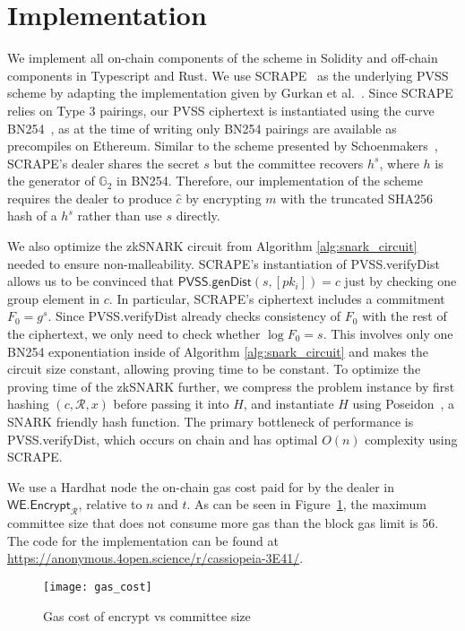 \section{Implementation}

We implement all on-chain components of the scheme in Solidity and off-chain components in Typescript and Rust.
We use SCRAPE~\cite{pvss_scrape} as the underlying PVSS scheme by adapting the implementation given by Gurkan et al.~\cite{aggregatable_dkg}.
Since SCRAPE relies on Type 3 pairings, our PVSS ciphertext is instantiated using the curve BN254~\cite{bn254}, as at the time of writing only BN254 pairings are available as precompiles on Ethereum.
Similar to the scheme presented by Schoenmakers~\cite{pvss_schoenmakers}, SCRAPE's dealer shares the secret $s$ but the committee recovers $h^s$, where $h$ is the generator of $\mathbb{G}_2$ in BN254.
Therefore, our implementation of the scheme requires the dealer to produce $\hat{c}$ by encrypting $m$ with the truncated SHA256 hash of a $h^s$ rather than use $s$ directly.

We also optimize the zkSNARK circuit from Algorithm \ref{alg:snark_circuit} needed to ensure non-malleability.
SCRAPE's instantiation of \textsf{PVSS.verifyDist} allows us to be convinced that $\textsf{PVSS.genDist}(s, [pk_i]) = c$ just by checking one group element in $c$.
In particular, SCRAPE's ciphertext includes a commitment $F_0 = g^s$.
Since \textsf{PVSS.verifyDist} already checks consistency of $F_0$ with the rest of the ciphertext, we only need to check whether $\log F_0 = s$.
This involves only one BN254 exponentiation inside of Algorithm \ref{alg:snark_circuit} and makes the circuit size constant, allowing proving time to be constant.
To optimize the proving time of the zkSNARK further, we compress the problem instance by first hashing $(c, \mathcal{R}, x)$ before passing it into $H$, and instantiate $H$ using Poseidon~\cite{poseidon}, a SNARK friendly hash function.
The primary bottleneck of performance is \textsf{PVSS.verifyDist}, which occurs on chain and has optimal $O(n)$ complexity using SCRAPE.


We use a Hardhat node the on-chain gas cost paid for by the dealer in $\textsf{WE.Encrypt}_\mathcal{R}$, relative to $n$ and $t$.
As can be seen in Figure~\ref{fig:gas_cost}, the maximum committee size that does not consume more gas than the block gas limit is 56. 
The code for the implementation can be found at \url{https://anonymous.4open.science/r/cassiopeia-3E41/}.
\begin{figure}\label{fig:gas_cost}
\caption{Gas cost of \textsf{encrypt} vs committee size}
\texttt{[image: gas\_cost]}
\end{figure}


